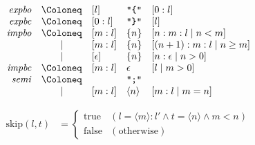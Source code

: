 \begin{align*}
  \begin{array}{rclll}
    \mathit{expbo}
    & \Coloneq & [l] &\text{\texttt{\textquotedbl\{\textquotedbl}} &[0:l] \\
    \mathit{expbc}
    & \Coloneq & [0:l] &\text{\texttt{\textquotedbl\}\textquotedbl}} &[l] \\
    \mathit{impbo}
    & \Coloneq & [m:l] &\{ n\} &[n:m:l \mid n < m] \\
    & \mid & [m:l] &\{ n\} &[(n + 1):m:l \mid n \geq m] \\
    & \mid & [\epsilon] &\{ n\} &[n:\epsilon \mid n > 0] \\
    \mathit{impbc}
    & \Coloneq & [m:l] &\epsilon &[l \mid m > 0] \\
    \mathit{semi}
    & \Coloneq & &\text{\texttt{\textquotedbl ;\textquotedbl}} \\
    & \mid & [m:l] & \langle n\rangle &[m:l \mid m = n]
  \end{array}
\end{align*}

\begin{align*}
  \mathrm{skip}(l, t) &= \left\{\begin{array}{ll}
    \mathrm{true} &(l = \langle m\rangle:l' \land t = \langle n\rangle \land m < n) \\
    \mathrm{false} &(\text{otherwise})
  \end{array}\right.
\end{align*}
